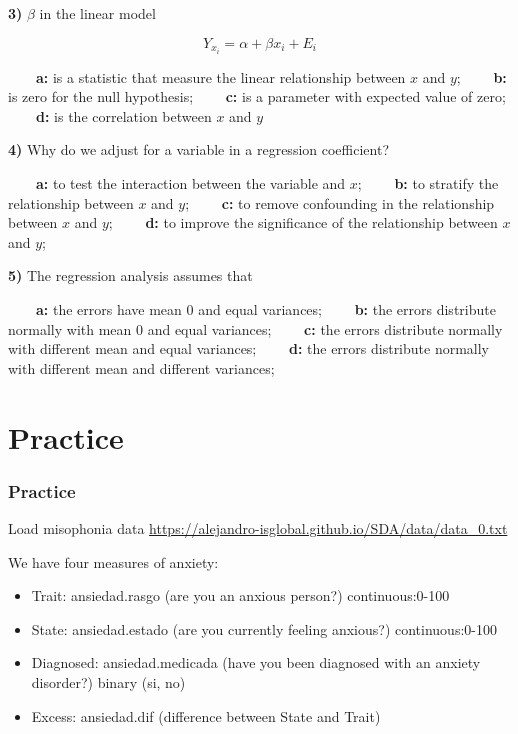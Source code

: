 \documentclass[
]{book}
\providecommand{\tightlist}{%
  \setlength{\itemsep}{0pt}\setlength{\parskip}{0pt}}
\begin{document}
\textbf{3)} \(\beta\) in the linear model

\[Y_{x_i} = \alpha + \beta x_i +E_{i}\]

\textbf{\(\qquad\)a:} is a statistic that measure the linear relationship between \(x\) and \(y\);
\textbf{\(\qquad\)b:} is zero for the null hypothesis;
\textbf{\(\qquad\)c:} is a parameter with expected value of zero;
\textbf{\(\qquad\)d:} is the correlation between \(x\) and \(y\)

\textbf{4)} Why do we adjust for a variable in a regression coefficient?

\textbf{\(\qquad\)a:} to test the interaction between the variable and \(x\);
\textbf{\(\qquad\)b:} to stratify the relationship between \(x\) and \(y\);
\textbf{\(\qquad\)c:} to remove confounding in the relationship between \(x\) and \(y\);
\textbf{\(\qquad\)d:} to improve the significance of the relationship between \(x\) and \(y\);

\textbf{5)} The regression analysis assumes that

\textbf{\(\qquad\)a:} the errors have mean 0 and equal variances;
\textbf{\(\qquad\)b:} the errors distribute normally with mean 0 and equal variances;
\textbf{\(\qquad\)c:} the errors distribute normally with different mean and equal variances;
\textbf{\(\qquad\)d:} the errors distribute normally with different mean and different variances;

\hypertarget{practice-8}{%
\section{Practice}\label{practice-8}}

\hypertarget{practice-9}{%
\subsubsection{Practice}\label{practice-9}}

Load misophonia data \url{https://alejandro-isglobal.github.io/SDA/data/data_0.txt}

We have four measures of anxiety:

\begin{itemize}
\tightlist
\item
  Trait: ansiedad.rasgo (are you an anxious person?) continuous:0-100
\item
  State: ansiedad.estado (are you currently feeling anxious?) continuous:0-100
\item
  Diagnosed: ansiedad.medicada (have you been diagnosed with an anxiety disorder?) binary (si, no)
\item
  Excess: ansiedad.dif (difference between State and Trait)
\end{itemize}
\end{document}
